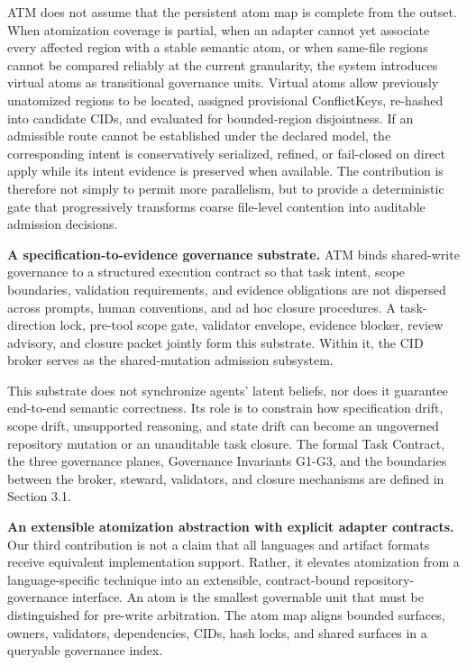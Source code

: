\documentclass[9pt,letterpaper]{extarticle}
\begin{document}
ATM does not assume that the persistent atom map is complete from the outset. When atomization coverage is partial, when an adapter cannot yet associate every affected region with a stable semantic atom, or when same-file regions cannot be compared reliably at the current granularity, the system introduces virtual atoms as transitional governance units. Virtual atoms allow previously unatomized regions to be located, assigned provisional ConflictKeys, re-hashed into candidate CIDs, and evaluated for bounded-region disjointness. If an admissible route cannot be established under the declared model, the corresponding intent is conservatively serialized, refined, or fail-closed on direct apply while its intent evidence is preserved when available. The contribution is therefore not simply to permit more parallelism, but to provide a deterministic gate that progressively transforms coarse file-level contention into auditable admission decisions.

\textbf{A specification-to-evidence governance substrate.} ATM binds shared-write governance to a structured execution contract so that task intent, scope boundaries, validation requirements, and evidence obligations are not dispersed across prompts, human conventions, and ad hoc closure procedures. A task-direction lock, pre-tool scope gate, validator envelope, evidence blocker, review advisory, and closure packet jointly form this substrate. Within it, the CID broker serves as the shared-mutation admission subsystem.

This substrate does not synchronize agents' latent beliefs, nor does it guarantee end-to-end semantic correctness. Its role is to constrain how specification drift, scope drift, unsupported reasoning, and state drift can become an ungoverned repository mutation or an unauditable task closure. The formal Task Contract, the three governance planes, Governance Invariants G1-G3, and the boundaries between the broker, steward, validators, and closure mechanisms are defined in Section 3.1.

\textbf{An extensible atomization abstraction with explicit adapter contracts.} Our third contribution is not a claim that all languages and artifact formats receive equivalent implementation support. Rather, it elevates atomization from a language-specific technique into an extensible, contract-bound repository-governance interface. An atom is the smallest governable unit that must be distinguished for pre-write arbitration. The atom map aligns bounded surfaces, owners, validators, dependencies, CIDs, hash locks, and shared surfaces in a queryable governance index.
\end{document}
